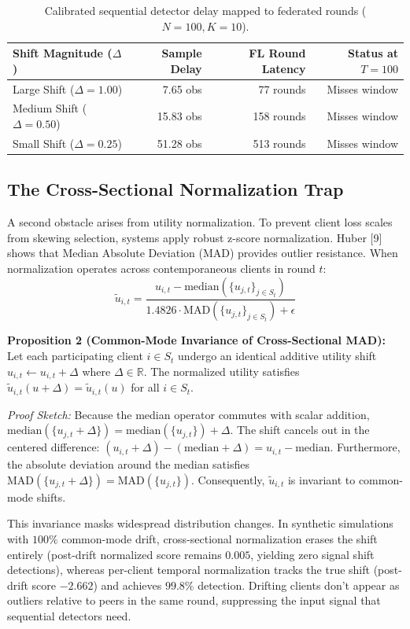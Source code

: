 \documentclass[conference]{IEEEtran}
\begin{document}
\begin{table}[h]
\centering
\caption{Calibrated sequential detector delay mapped to federated rounds ($N=100, K=10$).}
\label{tab:delay_mapping}
\begin{tabular}{lrrr}
\toprule
Shift Magnitude ($\Delta$) & Sample Delay & FL Round Latency & Status at $T=100$ \\
\midrule
Large Shift ($\Delta = 1.00$) & 7.65 obs & 77 rounds & Misses window \\
Medium Shift ($\Delta = 0.50$) & 15.83 obs & 158 rounds & Misses window \\
Small Shift ($\Delta = 0.25$) & 51.28 obs & 513 rounds & Misses window \\
\bottomrule
\end{tabular}
\end{table}

\subsection{The Cross-Sectional Normalization Trap}
A second obstacle arises from utility normalization. To prevent client loss scales from skewing selection, systems apply robust z-score normalization. Huber [9] shows that Median Absolute Deviation (MAD) provides outlier resistance. When normalization operates across contemporaneous clients in round $t$:
\begin{equation}
\tilde{u}_{i,t} = \frac{u_{i,t} - \text{median}(\{u_{j,t}\}_{j \in S_t})}{1.4826 \cdot \text{MAD}(\{u_{j,t}\}_{j \in S_t}) + \epsilon}
\end{equation}

\textbf{Proposition 2 (Common-Mode Invariance of Cross-Sectional MAD):} Let each participating client $i \in S_t$ undergo an identical additive utility shift $u_{i,t} \leftarrow u_{i,t} + \Delta$ where $\Delta \in \mathbb{R}$. The normalized utility satisfies $\tilde{u}_{i,t}(u + \Delta) = \tilde{u}_{i,t}(u)$ for all $i \in S_t$.

\textit{Proof Sketch:} Because the median operator commutes with scalar addition, $\text{median}(\{u_{j,t} + \Delta\}) = \text{median}(\{u_{j,t}\}) + \Delta$. The shift cancels out in the centered difference: $(u_{i,t} + \Delta) - (\text{median} + \Delta) = u_{i,t} - \text{median}$. Furthermore, the absolute deviation around the median satisfies $\text{MAD}(\{u_{j,t} + \Delta\}) = \text{MAD}(\{u_{j,t}\})$. Consequently, $\tilde{u}_{i,t}$ is invariant to common-mode shifts.

This invariance masks widespread distribution changes. In synthetic simulations with $100\%$ common-mode drift, cross-sectional normalization erases the shift entirely (post-drift normalized score remains $0.005$, yielding zero signal shift detections), whereas per-client temporal normalization tracks the true shift (post-drift score $-2.662$) and achieves $99.8\%$ detection. Drifting clients don't appear as outliers relative to peers in the same round, suppressing the input signal that sequential detectors need.
\end{document}
